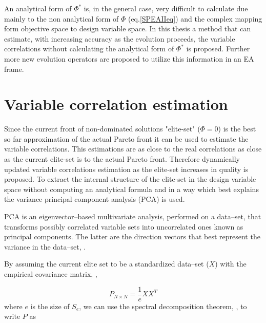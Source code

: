 An analytical form of $\Phi^*$ is, in the general case, very difficult to calculate due mainly to the non analytical form of $\Phi$ (eq.\ref{SPEAIIeq}) and the complex mapping form objective space to design variable space. In this thesis a method that can estimate, with increasing accuracy as the evolution proceeds, the variable correlations without calculating the analytical form of $\Phi^*$ is proposed. Further more new evolution operators are proposed to utilize this information in an EA frame.  

\section{Variable correlation estimation}
Since the current front of non-dominated solutions "elite-set" ($\Phi=0$) is the best so far approximation of the actual Pareto front it can be used to estimate the variable correlations. This estimations are as close to the real correlations as close as the current elite-set is to the actual Pareto front. Therefore dynamically updated variable correlations estimation as the elite-set increases in quality is proposed. To extract the internal structure of the elite-set in the design variable space without computing an analytical formula and in a way which best explains the variance principal component analysis (PCA) is used. 
 
PCA is an eigenvector--based multivariate analysis, performed on a data--set, that transforms possibly correlated variable sets into uncorrelated ones known as principal components. The latter are the direction vectors that best represent the variance in the data--set, \cite{Haykin,Jolliffe_2002}.
 
By assuming the current elite set to be a standardized data--set ($X$) with the empirical covariance matrix, \cite{Fodor_2002, Jolliffe_2002},

\begin{equation} 
   P_{N\times N}= \frac{1}{e}XX^T
   \label{Cov_Mat} 
\end{equation}
where $e$ is the size of $S_e$, we can use the spectral decomposition theorem, \cite{Axler_1997, Fodor_2002}, to write $P$ as

